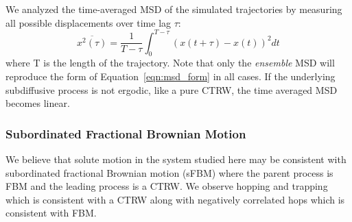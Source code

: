 \documentclass{article}
\begin{document}
  We analyzed the time-averaged MSD of the simulated trajectories by measuring
  all possible displacements over time lag $\tau$:
  \begin{equation}
  \overline{x^2(\tau)} = \dfrac{1}{T - \tau}\int_{0}^{T - \tau} (x(t + \tau) - x(t))^2 dt
  \end{equation}
  where T is the length of the trajectory. Note that only the \textit{ensemble} MSD
  will reproduce the form of Equation~\ref{eqn:msd_form} in all cases. If the underlying 
  subdiffusive process is not ergodic, like a pure CTRW, the time averaged MSD becomes
  linear.~\cite{meroz_toolbox_2015} 
  
   

  \subsubsection*{Subordinated Fractional Brownian Motion}
  
  We believe that solute motion in the system studied here may be consistent with 
  subordinated fractional Brownian motion (sFBM) where the parent process is FBM and 
  the leading process is a CTRW. We observe hopping and trapping which is consistent
  with a CTRW along with negatively correlated hops which is consistent with FBM.  
\end{document}
